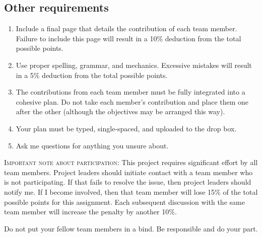 \documentclass[12pt, hidelinks]{exam}
\begin{document}
\subsection*{Other requirements}

\begin{enumerate}[label=\textsc{\alph*}.]
	
	\item Include a final page that details the contribution of each team member. Failure to include this page will result in a 10\% deduction from the total possible points.
	
	\item Use proper spelling, grammar, and mechanics. Excessive mistakes will result in a 5\% deduction from the total possible points.
	
	\item The contributions from each team member must be fully integrated into a cohesive plan. Do not take each member's contribution and place them one after the other (although the objectives may be arranged this way). 
	
	\item Your plan must be typed, single-spaced, and uploaded to the drop box.
	
	\item Ask me questions for anything you unsure about.
	
\end{enumerate}

\textsc{Important note about participation}: This project requires significant effort by all team members. Project leaders should initiate contact with a team member who is not participating. If that fails to resolve the issue, then project leaders should notify me. If I become involved, then that team member will lose 15\% of the total possible
points for this assignment. Each subsequent discussion with the same team member will increase the penalty by another 10\%. 

Do not put your fellow team members in a bind. Be responsible and do your part.
\end{document}
